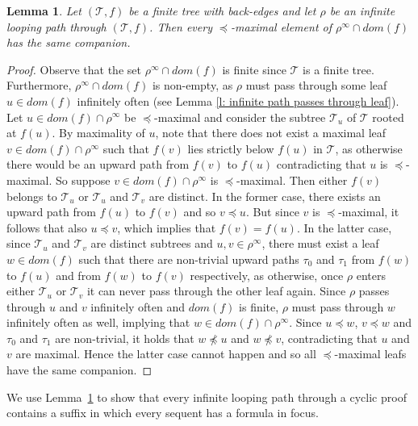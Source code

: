 \documentclass{myifcolog}
\newtheorem{lemma}[theorem]{Lemma}
\numberwithin{theorem}{section}
\begin{document}
      \begin{lemma}\label{l: existence of greatest element}
          Let $(\mathcal{T},f)$ be a finite tree with back-edges and let $\rho$ be an infinite looping path through $(\mathcal{T},f)$. Then every $\preceq$-maximal element of $\rho^{\infty} \cap dom(f)$ has the same companion.
      \end{lemma}
      
      \begin{proof}
          Observe that the set $\rho^{\infty} \cap dom(f)$ is finite since $\mathcal{T}$ is a finite tree. Furthermore, $\rho^{\infty} \cap dom(f)$ is non-empty, as $\rho$ must pass through some leaf $u \in dom(f)$ infinitely often (see Lemma \ref{l: infinite path passes through leaf}). Let $u \in dom(f) \cap \rho^\infty$ be $\preceq$-maximal and consider the subtree $\mathcal{T}_u$ of $\mathcal{T}$ rooted at $f(u)$. By maximality of $u$, note that there does not exist a maximal leaf $v \in dom(f) \cap \rho^\infty$ such that $f(v)$ lies strictly below $f(u)$ in $\mathcal{T}$, as otherwise there would be an upward path from $f(v)$ to $f(u)$ contradicting that $u$ is $\preceq$-maximal. So suppose $v \in dom(f) \cap \rho^\infty$ is $\preceq$-maximal. Then either $f(v)$ belongs to $\mathcal{T}_u$ or $\mathcal{T}_u$ and $\mathcal{T}_v$ are distinct. In the former case, there exists an upward path from $f(u)$ to $f(v)$ and so $v \preceq u$. But since $v$ is $\preceq$-maximal, it follows that also $u \preceq v$, which implies that $f(v) = f(u)$. In the latter case, since $\mathcal{T}_u$ and $\mathcal{T}_v$ are distinct subtrees and $u,v \in \rho^\infty$, there must exist a leaf $w \in dom(f)$ such that there are non-trivial upward paths $\tau_0$ and $\tau_1$ from $f(w)$ to $f(u)$ and from $f(w)$ to $f(v)$ respectively, as otherwise, once $\rho$ enters either $\mathcal{T}_u$ or $\mathcal{T}_v$ it can never pass through the other leaf again. Since $\rho$ passes through $u$ and $v$ infinitely often and $dom(f)$ is finite, $\rho$ must pass through $w$ infinitely often as well, implying that $w \in dom(f) \cap \rho^\infty$. Since $u \preceq w$, $v \preceq w$ and $\tau_0$ and $\tau_1$ are non-trivial, it holds that $w \not \preceq u$ and $w \not \preceq v$, contradicting that $u$ and $v$ are maximal. Hence the latter case cannot happen and so all $\preceq$-maximal leafs have the same companion.
      \end{proof}
      
We use Lemma~\ref{l: existence of greatest element} to show that every infinite looping path through a cyclic proof contains a suffix in which every sequent has a formula in focus.
\end{document}
